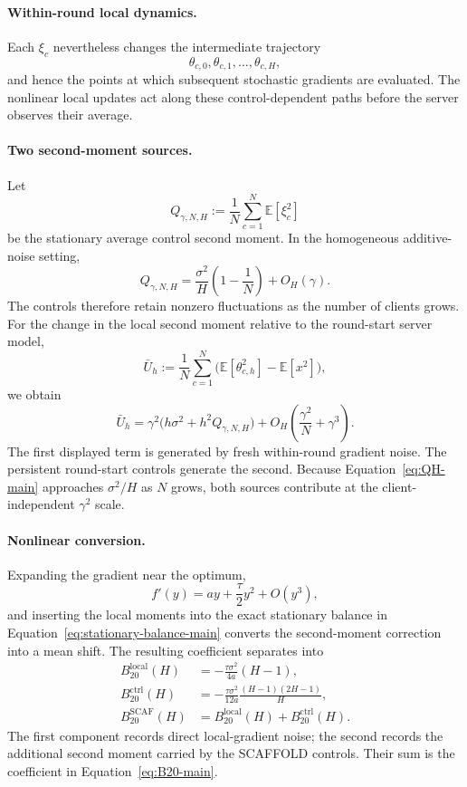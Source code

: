 \documentclass[11pt]{article}
\theoremstyle{definition}
\newcommand{\E}{\mathbb{E}}
\newcommand{\Scaf}{\textnormal{\textsc{SCAFFOLD}}}
\begin{document}
\paragraph{Within-round local dynamics.}
Each $\xi_c$ nevertheless changes the intermediate trajectory
\[
\theta_{c,0},\theta_{c,1},\ldots,\theta_{c,H},
\]
and hence the points at which subsequent stochastic gradients are evaluated. The nonlinear local updates act along these control-dependent paths before the server observes their average.

\paragraph{Two second-moment sources.}
Let
\[
Q_{\gamma,N,H}:=\frac1N\sum_{c=1}^N\E[\xi_c^2]
\]
be the stationary average control second moment. In the homogeneous additive-noise setting,
\begin{equation}
\label{eq:QH-main}
Q_{\gamma,N,H}=\frac{\sigma^2}{H}\left(1-\frac1N\right)+O_H(\gamma).
\end{equation}
The controls therefore retain nonzero fluctuations as the number of clients grows. For the change in the local second moment relative to the round-start server model,
\[
\bar U_h:=\frac1N\sum_{c=1}^N\bigl(\E[\theta_{c,h}^2]-\E[x^2]\bigr),
\]
we obtain
\begin{equation}
\label{eq:U-main}
\bar U_h
=\gamma^2\bigl(h\sigma^2+h^2Q_{\gamma,N,H}\bigr)
+O_H\!\left(\frac{\gamma^2}{N}+\gamma^3\right).
\end{equation}
The first displayed term is generated by fresh within-round gradient noise. The persistent round-start controls generate the second. Because Equation~\eqref{eq:QH-main} approaches $\sigma^2/H$ as $N$ grows, both sources contribute at the client-independent $\gamma^2$ scale.

\paragraph{Nonlinear conversion.}
Expanding the gradient near the optimum,
\[
f'(y)=ay+\frac{\tau}{2}y^2+O(y^3),
\]
and inserting the local moments into the exact stationary balance in Equation~\eqref{eq:stationary-balance-main} converts the second-moment correction into a mean shift. The resulting coefficient separates into
\begin{align}
B_{20}^{\mathrm{local}}(H)
&=-\frac{\tau\sigma^2}{4a}(H-1),\label{eq:Blocal-main}\\
B_{20}^{\mathrm{ctrl}}(H)
&=-\frac{\tau\sigma^2}{12a}\frac{(H-1)(2H-1)}{H},\label{eq:Bctrl-main}\\
B_{20}^{\mathrm{SCAF}}(H)
&=B_{20}^{\mathrm{local}}(H)+B_{20}^{\mathrm{ctrl}}(H).\label{eq:Bsum-main}
\end{align}
The first component records direct local-gradient noise; the second records the additional second moment carried by the \Scaf{} controls. Their sum is the coefficient in Equation~\eqref{eq:B20-main}.
\end{document}
